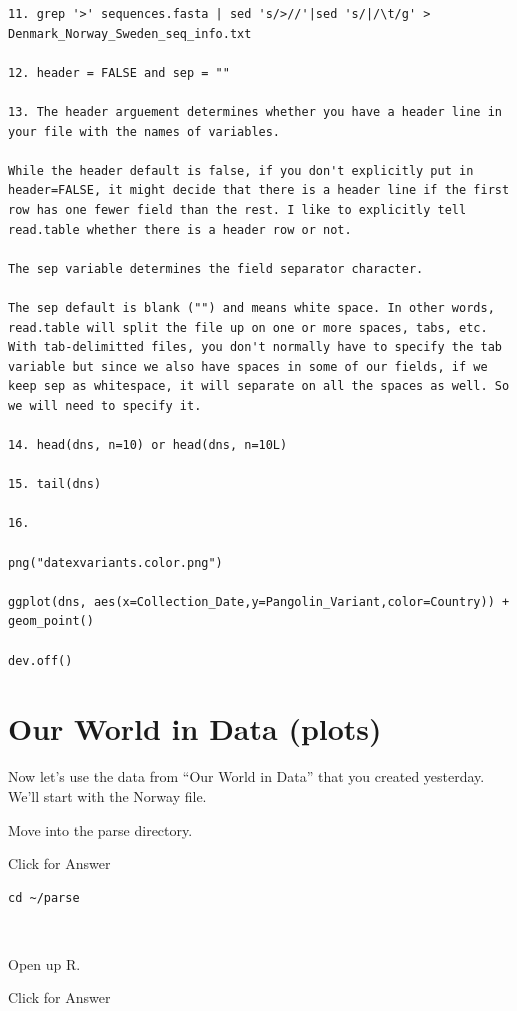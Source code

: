 \documentclass[
]{book}
\begin{document}
\begin{verbatim}
11. grep '>' sequences.fasta | sed 's/>//'|sed 's/|/\t/g' > Denmark_Norway_Sweden_seq_info.txt

12. header = FALSE and sep = ""

13. The header arguement determines whether you have a header line in your file with the names of variables.

While the header default is false, if you don't explicitly put in header=FALSE, it might decide that there is a header line if the first row has one fewer field than the rest. I like to explicitly tell read.table whether there is a header row or not.

The sep variable determines the field separator character.

The sep default is blank ("") and means white space. In other words, read.table will split the file up on one or more spaces, tabs, etc. With tab-delimitted files, you don't normally have to specify the tab variable but since we also have spaces in some of our fields, if we keep sep as whitespace, it will separate on all the spaces as well. So we will need to specify it.

14. head(dns, n=10) or head(dns, n=10L)

15. tail(dns)

16.

png("datexvariants.color.png")

ggplot(dns, aes(x=Collection_Date,y=Pangolin_Variant,color=Country)) + geom_point()

dev.off()
\end{verbatim}

\hypertarget{our-world-in-data-plots}{%
\chapter{Our World in Data (plots)}\label{our-world-in-data-plots}}

Now let's use the data from ``Our World in Data'' that you created yesterday. We'll start with the Norway file.

Move into the parse directory.

Click for Answer

\begin{verbatim}
cd ~/parse
\end{verbatim}

~

Open up R.

Click for Answer
\end{document}
